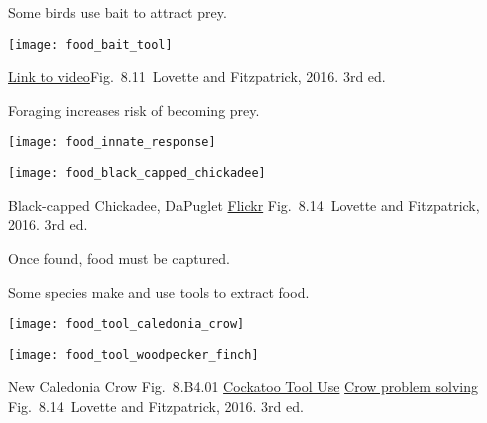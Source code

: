 \documentclass[t]{beamer}
\newcommand{\cornell}[1]{Fig.~#1~Lovette and Fitzpatrick, 2016. 3rd ed.}
\begin{document}
\begin{frame}[t,plain]{Some birds use bait to attract prey.}

	\texttt{[image: food\_bait\_tool]}

	\vfilll
	
	\tinynofill\href{https://www.youtube.com/watch?v=1M5sfVA7xEQ}{Link to video}\hfill \cornell{8.11}
\end{frame}


\begin{frame}[t]{Foraging increases risk of becoming prey.}

	\texttt{[image: food\_innate\_response]}

	\vspace{1.5\baselineskip}
	
	\centering
	
	\texttt{[image: food\_black\_capped\_chickadee]}
	
	\vfilll
	
	\tiny Black-capped Chickadee, DaPuglet \href{https://www.flickr.com/photos/43810158@N07/33349783941}{Flickr}  \hfill \cornell{8.14}

\end{frame}

{
\begin{frame}[b,plain]{Once found, food must be captured.}
	
	\tinyfill{\textcolor{white}{\cornell{8.18}}}
\end{frame}
}


\begin{frame}[t]{Some species make and use tools to extract food.}

	\vspace{-0.5\baselineskip}

	\begin{multicols}{2}
	\texttt{[image: food\_tool\_caledonia\_crow]}
	
	\columnbreak

	\texttt{[image: food\_tool\_woodpecker\_finch]}
	
	\end{multicols}

	\vfilll
	
	\tiny New Caledonia Crow Fig.~8.B4.01  \hfill \href{https://www.youtube.com/watch?v=vBQpqtbxplQ}{Cockatoo Tool Use} \hfill \href{https://www.youtube.com/watch?v=ZerUbHmuY04}{Crow problem solving}
	\hfill{\cornell{8.14}}

\end{frame}
\end{document}
